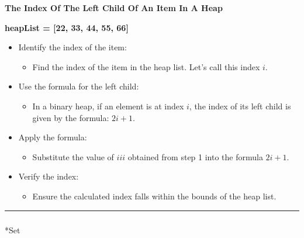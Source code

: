 \documentclass[
  letterpaper,
  DIV=11,
  numbers=noendperiod]{scrreprt}
\makeatletter
\let\oldsubparagraph\subparagraph
\renewcommand{\subparagraph}{
    \@ifstar
      \xxxSubParagraphStar
      \xxxSubParagraphNoStar
  }
\newcommand{\xxxSubParagraphStar}[1]{\oldsubparagraph*{#1}\mbox{}}
\newcommand{\xxxSubParagraphNoStar}[1]{\oldsubparagraph{#1}\mbox{}}
\providecommand{\tightlist}{%
  \setlength{\itemsep}{0pt}\setlength{\parskip}{0pt}}
\makeatother
\begin{document}
\begin{tcolorbox}[enhanced jigsaw, colframe=quarto-callout-note-color-frame, toprule=.15mm, bottomrule=.15mm, rightrule=.15mm, colback=white, breakable, arc=.35mm, opacityback=0, left=2mm, leftrule=.75mm]

\vspace{-3mm}\textbf{The Index Of The Left Child Of An Item In A Heap}\vspace{3mm}

\textbf{heapList = {[}22, 33, 44, 55, 66{]}}

\begin{itemize}
\tightlist
\item
  Identify the index of the item:

  \begin{itemize}
  \tightlist
  \item
    Find the index of the item in the heap list. Let's call this index
    \(i\).
  \end{itemize}
\item
  Use the formula for the left child:

  \begin{itemize}
  \tightlist
  \item
    In a binary heap, if an element is at index \(i\), the index of its
    left child is given by the formula: \(2i+1\).
  \end{itemize}
\item
  Apply the formula:

  \begin{itemize}
  \tightlist
  \item
    Substitute the value of \(iii\) obtained from step 1 into the
    formula \(2i+1\).
  \end{itemize}
\item
  Verify the index:

  \begin{itemize}
  \tightlist
  \item
    Ensure the calculated index falls within the bounds of the heap
    list.
  \end{itemize}
\end{itemize}

\end{tcolorbox}

\begin{center}\rule{0.5\linewidth}{0.5pt}\end{center}

\subparagraph*{Set}\label{set}
\end{document}
